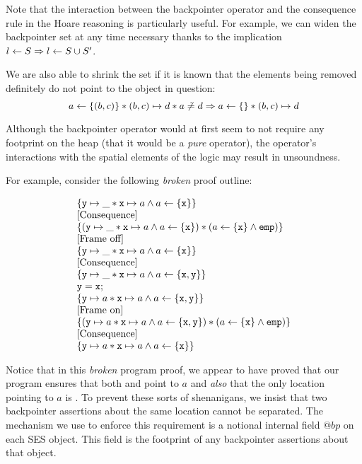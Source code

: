 \documentclass[a4paper,notitlepage]{report}
\begin{document}
Note that the interaction between the backpointer operator and the consequence rule in the
Hoare reasoning is particularly useful.
For example, we can widen the backpointer set at any time necessary thanks to
the implication $l \leftarrow S \Rightarrow l \leftarrow S \cup S'$.

We are also able to shrink the set if it is known that the elements being
removed definitely do not point to the object in question:
\[
  a \leftarrow \{(b,c)\} \mathbin{*} (b,c) \mapsto d \mathbin{*} a \not\doteq d \Rightarrow a \leftarrow \{\} \mathbin{*} (b,c) \mapsto d
\]

Although the backpointer operator would at first seem to not require any
footprint on the heap (that it would be a \emph{pure} operator), the operator's
interactions with the spatial elements of the logic may result in unsoundness.

For example, consider the following \emph{broken} proof outline:

\[
\begin{array}{l}
  \{\mathtt{y}\mapsto\_ \mathbin{*} \mathtt{x} \mapsto a \land a \leftarrow \{\mathtt{x}\} \}\\
  \text{[Consequence]}\\
  \{(\mathtt{y}\mapsto\_ \mathbin{*} \mathtt{x} \mapsto a \land a \leftarrow \{\mathtt{x}\}) \mathbin{*} (a \leftarrow \{\mathtt{x}\} \land \texttt{emp}) \}\\
  \text{[Frame off]}\\
  \{\mathtt{y}\mapsto\_ \mathbin{*} \mathtt{x} \mapsto a \land a \leftarrow \{\mathtt{x}\} \}\\
  \text{[Consequence]}\\
  \{\mathtt{y}\mapsto\_ \mathbin{*} \mathtt{x} \mapsto a \land a \leftarrow \{\mathtt{x},\mathtt{y}\} \}\\
  \mathtt{y = x;}\\
  \{\mathtt{y}\mapsto a \mathbin{*} \mathtt{x} \mapsto a \land a \leftarrow \{\mathtt{x},\mathtt{y}\} \}\\
  \text{[Frame on]}\\
  \{(\mathtt{y}\mapsto a \mathbin{*} \mathtt{x} \mapsto a \land a \leftarrow \{\mathtt{x},\mathtt{y}\}) \mathbin{*} (a \leftarrow \{\mathtt{x}\} \land \texttt{emp}) \}\\
  \text{[Consequence]}\\
  \{\mathtt{y}\mapsto a \mathbin{*} \mathtt{x} \mapsto a \land a \leftarrow \{\mathtt{x}\} \}\\
\end{array}
\]

Notice that in this \emph{broken} program proof, we appear to have proved that
our program ensures that both  and  point to $a$ and \emph{also}
that the only location pointing to $a$ is . To prevent these sorts of
shenanigans, we insist that two backpointer assertions about the same location
cannot be separated. The mechanism we use to enforce this requirement is a
notional internal field $@bp$ on each SES object. This field is the footprint of
any backpointer assertions about that object.
\end{document}
